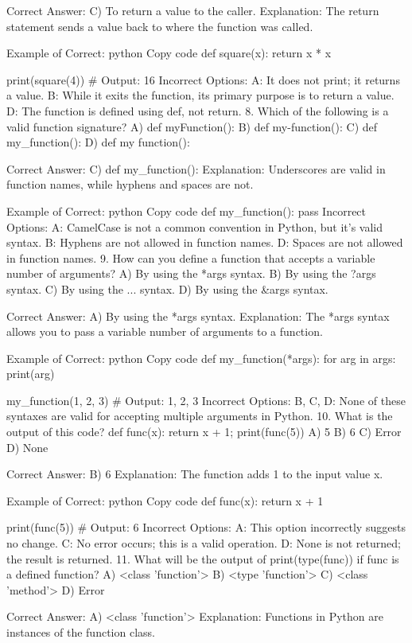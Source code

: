 Correct Answer: C) To return a value to the caller.
Explanation: The return statement sends a value back to where the function was called.

Example of Correct:
python
Copy code
def square(x):
    return x * x

print(square(4))  # Output: 16
Incorrect Options:
A: It does not print; it returns a value.
B: While it exits the function, its primary purpose is to return a value.
D: The function is defined using def, not return.
8. Which of the following is a valid function signature?
A) def myFunction():
B) def my-function():
C) def my_function():
D) def my function():

Correct Answer: C) def my_function():
Explanation: Underscores are valid in function names, while hyphens and spaces are not.

Example of Correct:
python
Copy code
def my_function():
    pass
Incorrect Options:
A: CamelCase is not a common convention in Python, but it's valid syntax.
B: Hyphens are not allowed in function names.
D: Spaces are not allowed in function names.
9. How can you define a function that accepts a variable number of arguments?
A) By using the *args syntax.
B) By using the ?args syntax.
C) By using the ... syntax.
D) By using the &args syntax.

Correct Answer: A) By using the *args syntax.
Explanation: The *args syntax allows you to pass a variable number of arguments to a function.

Example of Correct:
python
Copy code
def my_function(*args):
    for arg in args:
        print(arg)

my_function(1, 2, 3)  # Output: 1, 2, 3
Incorrect Options:
B, C, D: None of these syntaxes are valid for accepting multiple arguments in Python.
10. What is the output of this code? def func(x): return x + 1; print(func(5))
A) 5
B) 6
C) Error
D) None

Correct Answer: B) 6
Explanation: The function adds 1 to the input value x.

Example of Correct:
python
Copy code
def func(x):
    return x + 1

print(func(5))  # Output: 6
Incorrect Options:
A: This option incorrectly suggests no change.
C: No error occurs; this is a valid operation.
D: None is not returned; the result is returned.
11. What will be the output of print(type(func)) if func is a defined function?
A) <class 'function'>
B) <type 'function'>
C) <class 'method'>
D) Error

Correct Answer: A) <class 'function'>
Explanation: Functions in Python are instances of the function class.

